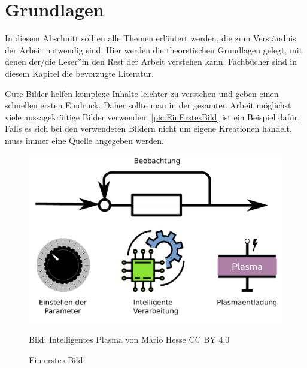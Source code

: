 

\clearpage

\section{Grundlagen}

In diesem Abschnitt sollten alle Themen erläutert werden, die zum Verständnis der Arbeit notwendig sind. Hier werden die theoretischen Grundlagen gelegt, mit denen der/die Leser*in den Rest der Arbeit verstehen kann. Fachbücher \cite{Helmke2016,Metelmann2016} sind in diesem Kapitel die bevorzugte Literatur. 

Gute Bilder helfen komplexe Inhalte leichter zu verstehen und geben einen schnellen ersten Eindruck. Daher sollte man in der gesamten Arbeit möglichst viele aussagekräftige Bilder verwenden. \autoref{pic:EinErstesBild} ist ein Beispiel dafür. Falls es sich bei den verwendeten Bildern nicht um eigene Kreationen handelt, muss immer eine Quelle angegeben werden.

\begin{figure}[htbp]
	\centering
	\includegraphics[width=0.5\linewidth]{pic/IntelligentesPlasma.pdf}
	\caption{Ein erstes Bild}
	{\scriptsize Bild: \glqq Intelligentes Plasma\grqq{} von Mario Hesse CC BY 4.0}
	\label{pic:EinErstesBild}
\end{figure}

